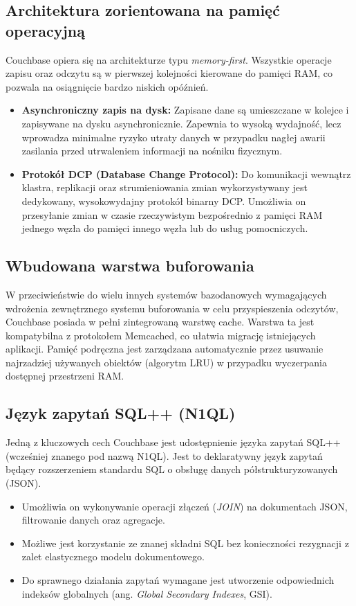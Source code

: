 \subsection{Architektura zorientowana na pamięć operacyjną}
Couchbase opiera się na architekturze typu \emph{memory-first}. Wszystkie operacje zapisu oraz odczytu są w pierwszej kolejności kierowane do pamięci RAM, co pozwala na osiągnięcie bardzo niskich opóźnień.
\begin{itemize}
    \item \textbf{Asynchroniczny zapis na dysk:} Zapisane dane są umieszczane w kolejce i zapisywane na dysku asynchronicznie. Zapewnia to wysoką wydajność, lecz wprowadza minimalne ryzyko utraty danych w przypadku nagłej awarii zasilania przed utrwaleniem informacji na nośniku fizycznym.
    \item \textbf{Protokół DCP (Database Change Protocol):} Do komunikacji wewnątrz klastra, replikacji oraz strumieniowania zmian wykorzystywany jest dedykowany, wysokowydajny protokół binarny DCP. Umożliwia on przesyłanie zmian w czasie rzeczywistym bezpośrednio z pamięci RAM jednego węzła do pamięci innego węzła lub do usług pomocniczych.
\end{itemize}

\subsection{Wbudowana warstwa buforowania}
W przeciwieństwie do wielu innych systemów bazodanowych wymagających wdrożenia zewnętrznego systemu buforowania w celu przyspieszenia odczytów, Couchbase posiada w pełni zintegrowaną warstwę cache. Warstwa ta jest kompatybilna z protokołem Memcached, co ułatwia migrację istniejących aplikacji. Pamięć podręczna jest zarządzana automatycznie przez usuwanie najrzadziej używanych obiektów (algorytm LRU) w przypadku wyczerpania dostępnej przestrzeni RAM.

\subsection{Język zapytań SQL++ (N1QL)}
Jedną z kluczowych cech Couchbase jest udostępnienie języka zapytań SQL++ (wcześniej znanego pod nazwą N1QL). Jest to deklaratywny język zapytań będący rozszerzeniem standardu SQL o obsługę danych półstrukturyzowanych (JSON).
\begin{itemize}
    \item Umożliwia on wykonywanie operacji złączeń (\emph{JOIN}) na dokumentach JSON, filtrowanie danych oraz agregacje.
    \item Możliwe jest korzystanie ze znanej składni SQL bez konieczności rezygnacji z zalet elastycznego modelu dokumentowego.
    \item Do sprawnego działania zapytań wymagane jest utworzenie odpowiednich indeksów globalnych (ang. \emph{Global Secondary Indexes}, GSI).
\end{itemize}

